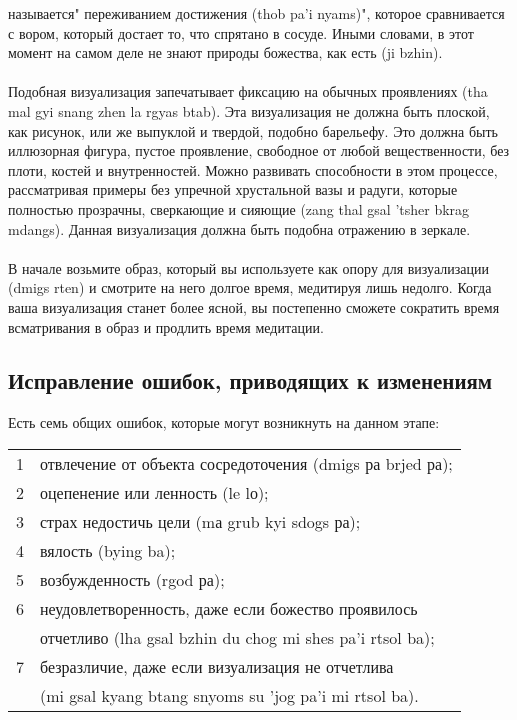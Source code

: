 называется" переживанием достижения (thob pa'i nyams)", которое сравнивается с вором,
который достает то, что спрятано в сосуде. Иными словами, в этот момент на самом деле не
знают природы божества, как есть (ji bzhin).\\
\\
Подобная визуализация запечатывает фиксацию на обычных проявлениях (tha mal gyi
snang zhen la rgyas btab). Эта визуализация не должна быть плоской, как рисунок, или же
выпуклой и твердой, подобно барельефу. Это должна быть иллюзорная фигура, пустое
проявление, свободное от любой вещественности, без плоти, костей и внутренностей. Можно
развивать способности в этом процессе, рассматривая примеры без упречной хрустальной
вазы и радуги, которые полностью прозрачны, сверкающие и сияющие (zang thal gsal 'tsher
bkrag mdangs). Данная визуализация должна быть подобна отражению в зеркале.\\
\\
В начале возьмите образ, который вы используете как опору для визуализации (dmigs
rten) и смотрите на него долгое время, медитируя лишь недолго. Когда ваша визуализация
станет более ясной, вы постепенно сможете сократить время всматривания в образ и
продлить время медитации.\\

\subsection{Исправление ошибок, приводящих к изменениям}

Есть семь общих ошибок, которые могут возникнуть на данном этапе:\\

\begin{tabular}{ll}
1 & отвлечение от объекта сосредоточения (dmigs ра brjed ра);\\
2 & оцепенение или ленность (le lо);\\
3 & страх недостичь цели (mа grub kyi sdogs ра);\\
4 & вялость (bying ba);\\
5 & возбужденность (rgod ра);\\
6 & неудовлетворенность, даже если божество проявилось \\
  & отчетливо (lha gsal bzhin du chog mi shes pa'i rtsol ba);\\
7 & безразличие, даже если визуализация не отчетлива \\
  & (mi gsal kyang btang snyoms su 'jog pa'i mi rtsol ba).\\
\end{tabular}

